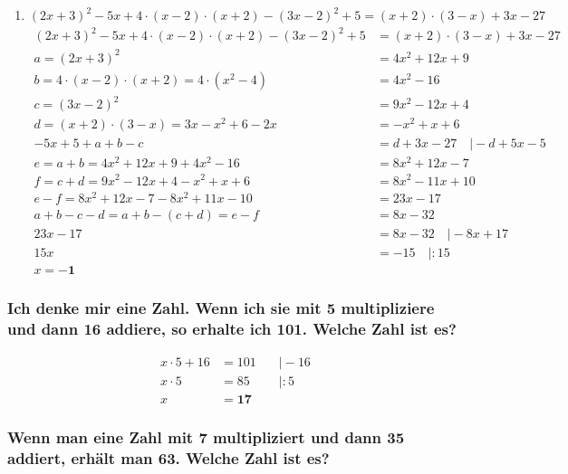 \documentclass[a4paper,10pt]{article} %
\begin{document}
\begin{enumerate}[label=\alph*)]
  \item \({(2x + 3)}^2 - 5x + 4 \cdot (x - 2) \cdot (x + 2) - {(3x - 2)}^2 + 5 = (x + 2) \cdot (3 - x) + 3x - 27\)
  \[
    \begin{aligned}
      {(2x + 3)}^2 - 5x + 4 \cdot (x - 2) \cdot (x + 2) - {(3x - 2)}^2 + 5 &= (x + 2) \cdot (3 - x) + 3x - 27 \\
      a = {(2x + 3)}^2 &= 4x^2 + 12x + 9 \\
      b = 4 \cdot (x - 2) \cdot (x + 2) = 4 \cdot (x^2 - 4) &= 4x^2 - 16 \\
      c = {(3x - 2)}^2 &= 9x^2 - 12x + 4\\
      d = (x + 2) \cdot (3 - x) = 3x - x^2 + 6 - 2x &= - x^2 + x + 6 \\
      - 5x + 5 + a + b - c &= d + 3x - 27 \quad\big| - d + 5x - 5 \\
      e = a + b = 4x^2 + 12x + 9 + 4x^2 - 16 &= 8x^2 + 12x - 7 \\
      f = c + d = 9x^2 - 12x + 4 - x^2 + x + 6 &= 8x^2 - 11x + 10 \\
      e - f = 8x^2 + 12x - 7 - 8x^2 + 11x - 10 &= 23x - 17 \\
      a + b - c - d = a + b - (c + d) = e - f &= 8x - 32 \\
      23x - 17 &= 8x - 32 \quad\big| - 8x + 17 \\
      15x &= -15 \quad\big| : 15 \\
      x = \mathbf{-1}
    \end{aligned}
  \]

\end{enumerate}

\subsubsection{Ich denke mir eine Zahl. Wenn ich sie mit 5 multipliziere und dann 16 addiere,
  so erhalte ich 101. Welche Zahl ist es?} %

\[
  \begin{aligned}
    x \cdot 5 + 16 &= 101 &\quad\big| - 16 \\
    x \cdot 5 &= 85 &\quad\big| : 5 \\
    x &= \mathbf{17}
  \end{aligned}
\]

\subsubsection{Wenn man eine Zahl mit 7 multipliziert und dann 35 addiert,
  erhält man 63. Welche Zahl ist es?} %
\end{document}
